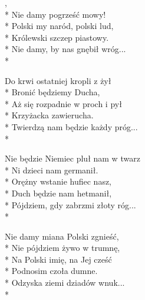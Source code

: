 \begin{lyrics}[longestline={Nie będzie Niemiec pluł nam w twarz}]

,\\*
Nie damy pogrześć mowy!\\*
Polski my naród, polski lud,\\*
Królewski szczep piastowy.\\*
Nie damy, by nas gnębił wróg...\\*

Do krwi ostatniej kropli z żył\\*
Bronić będziemy Ducha,\\*
Aż się rozpadnie w proch i pył\\*
Krzyżacka zawierucha.\\*
Twierdzą nam będzie każdy próg...\\*

Nie będzie Niemiec pluł nam w twarz\\*
Ni dzieci nam germanił.\\*
Orężny wstanie hufiec nasz,\\*
Duch będzie nam hetmanił,\\*
Pójdziem, gdy zabrzmi złoty róg...\\*

Nie damy miana Polski zgnieść,\\*
Nie pójdziem żywo w trumnę,\\*
Na Polski imię, na Jej cześć\\*
Podnosim czoła dumne.\\*
Odzyska ziemi dziadów wnuk...\\*
\end{lyrics}




